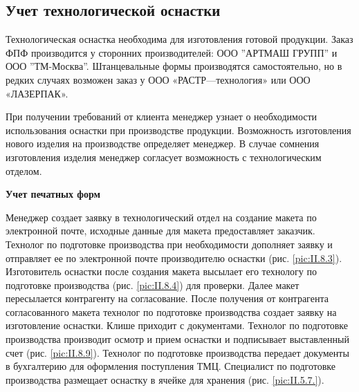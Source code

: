 \newpage
\subsection{Учет технологической оснастки }
\label{bp:rigging}
%
Технологическая оснастка необходима для изготовления готовой продукции. Заказ ФПФ производится у  сторонних производителей: ООО ''АРТМАШ ГРУПП'' и ООО ''ТМ-Москва''. Штанцевальные формы производятся самостоятельно, но в редких случаях возможен заказ у ООО «РАСТР—технология» или ООО «ЛАЗЕРПАК».   

При получении требований от клиента менеджер узнает о необходимости использования оснастки при производстве продукции. Возможность изготовления нового изделия на производстве определяет менеджер. В случае сомнения изготовления изделия менеджер согласует возможность с технологическим отделом.

\textbf{Учет печатных форм}

Менеджер создает заявку в технологический отдел на создание макета по электронной почте, исходные данные для макета предоставляет заказчик. Технолог по подготовке производства при необходимости дополняет заявку и отправляет ее по электронной почте производителю оснастки (рис. \ref{pic:II.8.3}). Изготовитель оснастки после создания макета высылает его технологу по подготовке производства (рис. \ref{pic:II.8.4}) для проверки. Далее макет пересылается контрагенту на согласование. После получения от контрагента согласованного макета технолог по подготовке производства создает  заявку на изготовление оснастки. Клише приходит с документами. Технолог по подготовке производства производит осмотр и прием оснастки и подписывает выставленный счет (рис. \ref{pic:II.8.9}). Технолог по подготовке производства передает документы в бухгалтерию для оформления поступления ТМЦ. Специалист по подготовке производства размещает оснастку в ячейке для хранения (рис. \ref{pic:II.5.7.}).  



